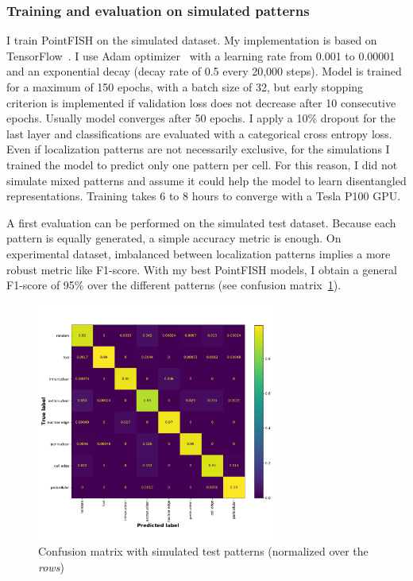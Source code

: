 \subsubsection{Training and evaluation on simulated patterns}

I train PointFISH on the simulated dataset.
My implementation is based on TensorFlow~\cite{tensorflow_2015}.
I use Adam optimizer~\cite{Diederik_2015} with a learning rate from 0.001 to 0.00001 and an exponential decay (decay rate of 0.5 every 20,000 steps).
Model is trained for a maximum of 150 epochs, with a batch size of 32, but early stopping criterion is implemented if validation loss does not decrease after 10 consecutive epochs.
Usually model converges after 50 epochs.
I apply a 10\% dropout for the last layer and classifications are evaluated with a categorical cross entropy loss.
Even if localization patterns are not necessarily exclusive, for the simulations I trained the model to predict only one pattern per cell.
For this reason, I did not simulate mixed patterns and assume it could help the model to learn disentangled representations.
Training takes 6 to 8 hours to converge with a Tesla P100 GPU.

A first evaluation can be performed on the simulated test dataset.
Because each pattern is equally generated, a simple accuracy metric is enough.
On experimental dataset, imbalanced between localization patterns implies a more robust metric like F1-score.
With my best PointFISH models, I obtain a general F1-score of 95\% over the different patterns (see confusion matrix~\ref{fig:confusion_matrix}).

\begin{figure}[]
    \centering
    \includegraphics[width=0.7\textwidth]{figures/chapter4/confusion_matrix}
    \caption[Confusion matrix with simulated test set]{Confusion matrix with simulated test patterns (normalized over the \textit{rows})}
    \label{fig:confusion_matrix}
\end{figure}

